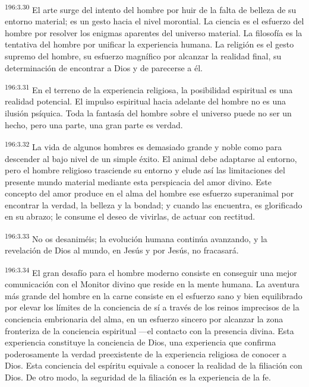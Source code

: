 \par 
\textsuperscript{196:3.30} El arte surge del intento del hombre por huir de la falta de belleza de su entorno material; es un gesto hacia el nivel morontial. La ciencia es el esfuerzo del hombre por resolver los enigmas aparentes del universo material. La filosofía es la tentativa del hombre por unificar la experiencia humana. La religión es el gesto supremo del hombre, su esfuerzo magnífico por alcanzar la realidad final, su determinación de encontrar a Dios y de parecerse a él.

\par 
\textsuperscript{196:3.31} En el terreno de la experiencia religiosa, la posibilidad espiritual es una realidad potencial. El impulso espiritual hacia adelante del hombre no es una ilusión psíquica. Toda la fantasía del hombre sobre el universo puede no ser un hecho, pero una parte, una gran parte es verdad.

\par 
\textsuperscript{196:3.32} La vida de algunos hombres es demasiado grande y noble como para descender al bajo nivel de un simple éxito. El animal debe adaptarse al entorno, pero el hombre religioso trasciende su entorno y elude así las limitaciones del presente mundo material mediante esta perspicacia del amor divino. Este concepto del amor produce en el alma del hombre ese esfuerzo superanimal por encontrar la verdad, la belleza y la bondad; y cuando las encuentra, es glorificado en su abrazo; le consume el deseo de vivirlas, de actuar con rectitud.

\par 
\textsuperscript{196:3.33} No os desaniméis; la evolución humana continúa avanzando, y la revelación de Dios al mundo, en Jesús y por Jesús, no fracasará.

\par 
\textsuperscript{196:3.34} El gran desafío para el hombre moderno consiste en conseguir una mejor comunicación con el Monitor divino que reside en la mente humana. La aventura más grande del hombre en la carne consiste en el esfuerzo sano y bien equilibrado por elevar los límites de la conciencia de sí a través de los reinos imprecisos de la conciencia embrionaria del alma, en un esfuerzo sincero por alcanzar la zona fronteriza de la conciencia espiritual ---el contacto con la presencia divina. Esta experiencia constituye la conciencia de Dios, una experiencia que confirma poderosamente la verdad preexistente de la experiencia religiosa de conocer a Dios. Esta conciencia del espíritu equivale a conocer la realidad de la filiación con Dios. De otro modo, la seguridad de la filiación es la experiencia de la fe.

